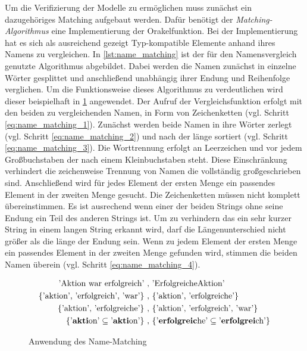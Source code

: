 Um die Verifizierung der Modelle zu ermöglichen muss zunächst ein dazugehöriges Matching aufgebaut werden.
Dafür benötigt der \emph{Matching-Algorithmus} eine Implementierung der Orakelfunktion.
Bei der Implementierung hat es sich als ausreichend gezeigt Typ-kompatible Elemente anhand ihres Namens zu vergleichen.
In \cref{lst:name_matching} ist der für den Namensvergleich genutzte Algorithmus abgebildet.
Dabei werden die Namen zunächst in einzelne Wörter gesplittet und anschließend unabhängig ihrer Endung und Reihenfolge verglichen.
Um die Funktionsweise dieses Algorithmus zu verdeutlichen wird dieser beispielhaft in \cref{eq:name_matching} angewendet.
Der Aufruf der Vergleichsfunktion erfolgt mit den beiden zu vergleichenden Namen, in Form von Zeichenketten (vgl. Schritt \ref{eq:name_matching_1}).
Zunächst werden beide Namen in ihre Wörter zerlegt (vgl. Schritt \ref{eq:name_matching_2}) und nach der länge sortiert (vgl. Schritt \ref{eq:name_matching_3}).
Die Worttrennung erfolgt an Leerzeichen und vor jedem Großbuchstaben der nach einem Kleinbuchstaben steht.
Diese Einschränkung verhindert die zeichenweise Trennung von Namen die vollständig großgeschrieben sind.
Anschließend wird für jedes Element der ersten Menge ein passendes Element in der zweiten Menge gesucht.
Die Zeichenketten müssen nicht komplett übereinstimmen.
Es ist ausrechend wenn einer der beiden Strings ohne seine Endung ein Teil des anderen Strings ist.
Um zu verhindern das ein sehr kurzer String in einem langen String erkannt wird, darf die Längenunterschied nicht größer als die länge der Endung sein.
Wenn zu jedem Element der ersten Menge ein passendes Element in der zweiten Menge gefunden wird, stimmen die beiden Namen überein (vgl. Schritt \ref{eq:name_matching_4}).

\begin{figure}
    \centering
    \begin{align}
        \text{'Aktion war erfolgreich'}\ ,&\ \text{'ErfolgreicheAktion'} \label{eq:name_matching_1}\\
        \text{\{'aktion', 'erfolgreich', 'war'\}}\ ,&\ \text{\{'aktion', 'erfolgreiche'\}} \label{eq:name_matching_2}\\
        \text{\{'aktion', 'erfolgreiche'\}}\ ,&\ \text{\{'aktion', 'erfolgreich', 'war'\}} \label{eq:name_matching_3}\\
        \text{\{'\textbf{akti}on'} \subseteq \text{'\textbf{akti}on'\}}\ ,&\ \text{\{'\textbf{erfolgreic}he'} \subseteq \text{'\textbf{erfolgrei}ch'\}} \label{eq:name_matching_4}
    \end{align}
    \caption{Anwendung des Name-Matching}
    \label{eq:name_matching}
\end{figure}

